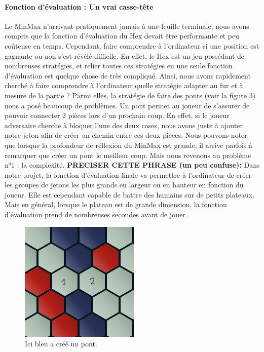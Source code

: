 \paragraph{Fonction d'évaluation : Un vrai casse-tête}Le MinMax n'arrivant pratiquement jamais à une feuille terminale, nous avons compris que la fonction
d'évaluation du Hex devait être performante et peu coûteuse en temps. Cependant, faire comprendre à l'ordinateur si une position est gagnante 
ou non s'est révélé difficile. En effet, le Hex est un jeu possédant de nombreuses stratégies, et relier toutes ces stratégies en une 
seule fonction d'évaluation est quelque chose de très compliqué. Ainsi, nous avons rapidement cherché à faire comprendre à l'ordinateur 
quelle stratégie adapter au fur et à mesure de la partie ? Parmi elles, la stratégie de faire des ponts (voir la figure 3) nous a posé beaucoup de problèmes.
Un pont permet au joueur de s'assurer de pouvoir connecter 2 pièces lors d'un prochain coup. En effet, si le joueur adversaire cherche à bloquer
l'une des deux cases, nous avons juste à ajouter notre jeton afin de créer un chemin entre ces deux pièces. Nous pouvons noter que lorsque la profondeur de 
réflexion du MinMax est grande, il arrive parfois à remarquer que créer un pont le meilleur coup. Mais nous revenons au problème n°1 : la complexité.
\textbf{PRECISER CETTE PHRASE (un peu confuse):} Dans notre projet, la fonction d'évaluation finale va permettre à l'ordinateur de créer les groupes de jetons les plus grands en largeur ou en hauteur en 
fonction du joueur. Elle est cependant capable de battre des humains sur de petits plateaux. Mais en général, lorsque le plateau est de grande dimension, la fonction
d'évaluation prend de nombreuses secondes avant de jouer.
\begin{figure}[h]
    \begin{center}
        \includegraphics[scale=0.5]{root/pont.png}
    \end{center}
    \caption[1]{Ici bleu a créé un pont\footnotemark.}\label{fig:pont_bleu}
\end{figure}
  
